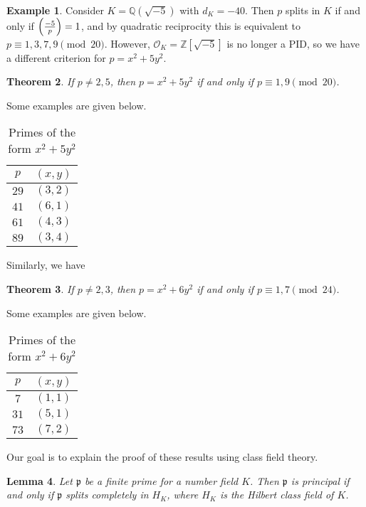 \documentclass[leqno, openany]{memoir}
\newtheorem{thm}{Theorem}[section]
\newtheorem{lem}[thm]{Lemma}
\theoremstyle{definition}
\newtheorem{exm}[thm]{Example}
\theoremstyle{remark}
\theoremstyle{plain}
\theoremstyle{definition}
\theoremstyle{remark}
\newcommand{\Z}{\mathbb{Z}}
\newcommand{\Q}{\mathbb{Q}}
\newcommand{\mc}[1]{\mathcal{#1}}
\newcommand{\mf}[1]{\mathfrak{#1}}
\begin{document}
\begin{exm} Consider $K = \Q(\sqrt{-5})$ with $d_K = -40$. Then $p$ splits in
    $K$ if and only if $\qty(\frac{-5}{p}) = 1$, and by quadratic reciprocity
    this is equivalent to $p \equiv 1,3,7,9 \pmod{20}$. However, $\mc{O}_K =
    \Z[\sqrt{-5}]$ is no longer a PID, so we have a different criterion for $p
    = x^2 + 5y^2$.  \end{exm}

\begin{thm} If $p \neq 2,5$, then $p=x^2 + 5y^2$ if and only if $p \equiv 1,9
\pmod{20}$.  \end{thm}

    Some examples are given below.  \begin{table}[H] \centering \caption{Primes
        of the form $x^2 + 5y^2$} \label{tab:label} \begin{tabular}{cc}
            \toprule $p$ & $(x,y)$ \\ \midrule $29$ & $(3,2)$ \\ $41$ & $(6,1)$
            \\ $61$ & $(4,3)$ \\ $89$ & $(3,4)$ \\ \bottomrule \end{tabular}
        \end{table}

Similarly, we have \begin{thm} If $p \neq 2,3$, then $p = x^2 + 6y^2$ if and
only if $p \equiv 1,7 \pmod{24}$.  \end{thm}

Some examples are given below.  \begin{table}[H] \centering \caption{Primes of
    the form $x^2 + 6y^2$} \label{tab:label} \begin{tabular}{cc} \toprule $p$ &
        $(x,y)$ \\ \midrule $7$ & $(1,1)$ \\ $31$ & $(5,1)$ \\ $73$ & $(7,2)$
        \\ \bottomrule \end{tabular} \end{table}

Our goal is to explain the proof of these results using class field theory.

\begin{lem} Let $\mf{p}$ be a finite prime for a number field $K$. Then
$\mf{p}$ is principal if and only if $\mf{p}$ splits completely in $H_K$, where
$H_K$ is the Hilbert class field of $K$.  \end{lem}
\end{document}
